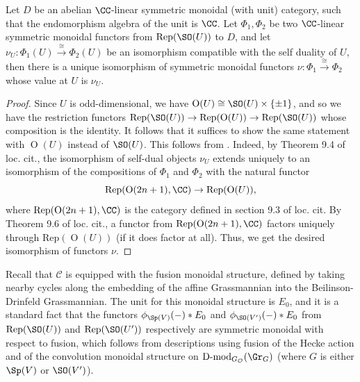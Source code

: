 \documentclass[11pt]{article}
\begin{document}
\begin{lemma}\label{lemma: Rep(SO) universal property}
    Let $D$ be an abelian $\CC$-linear symmetric monoidal (with unit) category, such that the endomorphism algebra of the unit is $\CC$.
    Let $\Phi_1, \Phi_2$ be two $\CC$-linear symmetric monoidal functors from $\mathrm{Rep}(\SO(U))$ to $D$, and let $\nu_U:\Phi_1(U)\xrightarrow{\cong} \Phi_2(U)$ be an isomorphism compatible with the self duality of $U$, then there is a unique isomorphism of symmetric monoidal functors $\nu:\Phi_1\xrightarrow{\cong} \Phi_2$ whose value at $U$ is $\nu_U$.
\end{lemma}
\begin{proof}
    Since $U$ is odd-dimensional, we have $\operatorname{O}(U)\cong \SO(U)\times \{\pm 1\}$, and so we have the restriction functors $\mathrm{Rep}(\SO(U))\to \mathrm{Rep}(\operatorname{O}(U))\to \mathrm{Rep}(\SO(U))$ whose composition is the identity. It follows that it suffices to show the same statement with $\operatorname{O}(U)$ instead of $\SO(U)$. This follows from \cite[Theorems 9.4, 9.6]{Del}. Indeed, by Theorem 9.4 of loc. cit., the isomorphism of self-dual objects $\nu_U$ extends uniquely to an isomorphism of the compositions of $\Phi_1$ and $\Phi_2$ with the natural functor $$\mathrm{Rep}(\operatorname{O}(2n+1),\CC)\to \mathrm{Rep}(\operatorname{O}(U)),$$ where $\mathrm{Rep}(\operatorname{O}(2n+1),\CC)$ is the category defined in section 9.3 of loc. cit.
    By Theorem 9.6 of loc. cit., a functor from $\mathrm{Rep}(\operatorname{O}(2n+1),\CC)$ factors uniquely through $\mathrm{Rep}(\operatorname{O}(U))$ (if it does factor at all). Thus, we get the desired isomorphism of functors $\nu$.
\end{proof}

Recall that $\mathcal{C}$ is equipped with the fusion monoidal structure, defined by taking nearby cycles along the embedding of the affine Grassmannian into the Beilinson-Drinfeld Grassmannian.
The unit for this monoidal structure is $E_0$, and it is a standard fact that the functors $\phi_{\Sp(V)}(-)*E_0$ and $\phi_{\SO(V')}(-)*E_0$ from $\mathrm{Rep}(\SO(U))$ and $\mathrm{Rep}(\SO(U'))$ respectively are symmetric monoidal with respect to fusion, which follows from descriptions using fusion of the Hecke action and of the convolution monoidal structure on $\operatorname{D-mod}_{G_\mathcal{O}}(\Gr_G)$ (where $G$ is either $\Sp(V)$ or $\SO(V')$).
\end{document}
